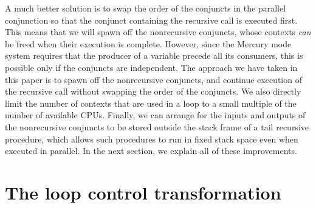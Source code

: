 A much better solution is to swap the order of the conjuncts
in the parallel conjunction
so that the conjunct containing the recursive call is executed first.
This means that we will spawn off the nonrecursive conjuncts,
whose contexts \emph{can} be freed when their execution is complete.
However, since the Mercury mode system requires that
the producer of a variable precede all its consumers,
this is possible only if the conjuncts are independent.
The approach we have taken in this paper
is to spawn off the nonrecursive conjuncts,
and continue execution of the recursive call
without swapping the order of the conjuncts.
We also directly limit the number of contexts that are used in a loop
to a small multiple of the number of available CPUs.
Finally, we can arrange for
the inputs and outputs of the nonrecursive conjuncts
to be stored outside the stack frame of a tail recursive procedure,
which allows such procedures to run in fixed stack space
even when executed in parallel.
In the next section, we explain all of these improvements.

%

\section{The loop control transformation}
\label{sec:transformation}


